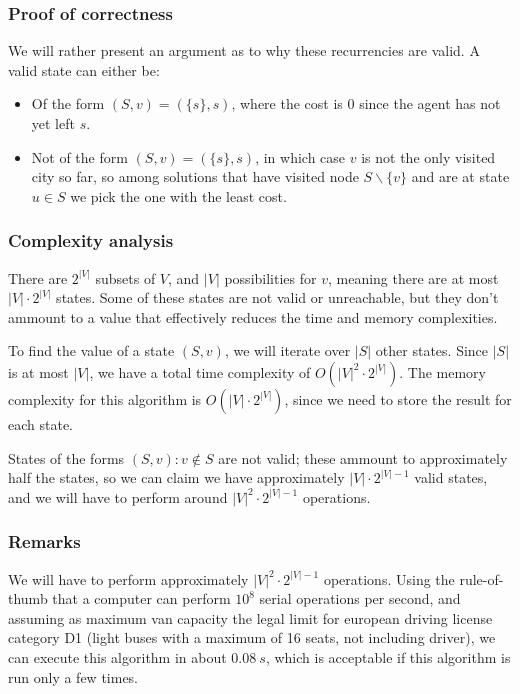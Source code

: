 \subsubsection{Proof of correctness}
We will rather present an argument as to why these recurrencies are valid. A valid state can either be:
\begin{itemize}
    \item Of the form $(S,v)=(\{s\}, s)$, where the cost is $0$ since the agent has not yet left $s$.
    \item Not of the form $(S,v)=(\{s\}, s)$, in which case $v$ is not the only visited city so far, so among solutions that have visited node $S \backslash \{v\}$ and are at state $u \in S$ we pick the one with the least cost.
\end{itemize}
\subsubsection{Complexity analysis}
There are $2^{|V|}$ subsets of $V$, and $|V|$ possibilities for $v$, meaning there are at most $|V| \cdot 2^{|V|}$ states. Some of these states are not valid or unreachable, but they don't ammount to a value that effectively reduces the time and memory complexities.\par
To find the value of a state $(S,v)$, we will iterate over $|S|$ other states. Since $|S|$ is at most $|V|$, we have a total time complexity of $O(|V|^2 \cdot 2^{|V|})$. The memory complexity for this algorithm is $O(|V| \cdot 2^{|V|})$, since we need to store the result for each state.\par
States of the forms $(S, v)\colon v \not \in S$ are not valid; these ammount to approximately half the states, so we can claim we have approximately $|V|\cdot 2^{|V|-1}$ valid states, and we will have to perform around $|V|^2\cdot 2^{|V|-1}$ operations.\par
\subsubsection{Remarks}
We will have to perform approximately $|V|^2\cdot 2^{|V|-1}$ operations. Using the rule-of-thumb that a computer can perform $10^8$ serial operations per second, and assuming as maximum van capacity the legal limit for european driving license category D1 (light buses with a maximum of 16 seats, not including driver)\cite{dir-2006-126-ec}, we can execute this algorithm in about $\SI{0.08}{s}$, which is acceptable if this algorithm is run only a few times.
